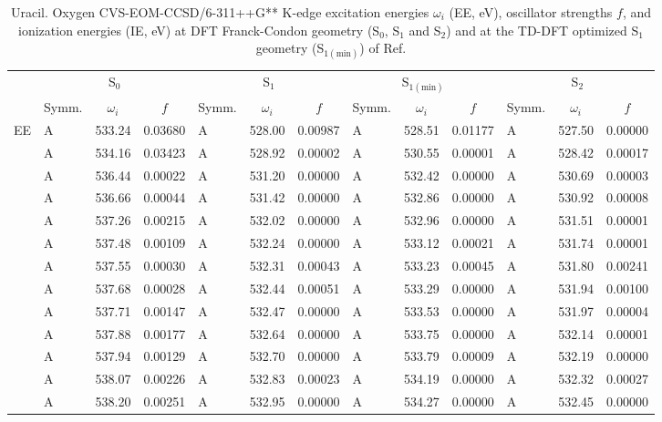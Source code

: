 \documentclass[journal=jctcce,manuscript=article]{achemso}
\begin{document}
\begin{table}
\caption{Uracil.  Oxygen CVS-EOM-CCSD/6-311++G** K-edge excitation energies $\omega_i$ (EE, eV), oscillator strengths $f$, and ionization energies (IE, eV) at DFT Franck-Condon geometry (S$_0$, S$_1$ and S$_2$) and at the TD-DFT optimized S$_1$ geometry (S$_{1(\text{min})}$) of Ref. 
\label{Tab:Uracil_DFT:Oxygen}}
\scriptsize
\begin{tabular}{l|lcc|lcc|lcc|lcc}
\cline{2-13}
& \multicolumn{3}{c|}{S$_0$}
& \multicolumn{3}{c|}{S$_1$}  
& \multicolumn{3}{c|}{S$_{1(\text{min})}$}
& \multicolumn{3}{c}{S$_2$}
\\
\cline{2-13}
& Symm. & $\omega_i$ & $f$ 
& Symm. & $\omega_i$ & $f$ 
& Symm. & $\omega_i$ & $f$ 
& Symm. & $\omega_i$ & $f$\\
\hline
  EE 
& A & 533.24 & 0.03680 & A & 528.00 & 0.00987 & A & 528.51 & 0.01177 & A & 527.50 & 0.00000 \\
& A & 534.16 & 0.03423 & A & 528.92 & 0.00002 & A & 530.55 & 0.00001 & A & 528.42 & 0.00017 \\
& A & 536.44 & 0.00022 & A & 531.20 & 0.00000 & A & 532.42 & 0.00000 & A & 530.69 & 0.00003 \\
& A & 536.66 & 0.00044 & A & 531.42 & 0.00000 & A & 532.86 & 0.00000 & A & 530.92 & 0.00008 \\
& A & 537.26 & 0.00215 & A & 532.02 & 0.00000 & A & 532.96 & 0.00000 & A & 531.51 & 0.00001 \\
& A & 537.48 & 0.00109 & A & 532.24 & 0.00000 & A & 533.12 & 0.00021 & A & 531.74 & 0.00001 \\
& A & 537.55 & 0.00030 & A & 532.31 & 0.00043 & A & 533.23 & 0.00045 & A & 531.80 & 0.00241 \\
& A & 537.68 & 0.00028 & A & 532.44 & 0.00051 & A & 533.29 & 0.00000 & A & 531.94 & 0.00100 \\
& A & 537.71 & 0.00147 & A & 532.47 & 0.00000 & A & 533.53 & 0.00000 & A & 531.97 & 0.00004 \\
& A & 537.88 & 0.00177 & A & 532.64 & 0.00000 & A & 533.75 & 0.00000 & A & 532.14 & 0.00001 \\
& A & 537.94 & 0.00129 & A & 532.70 & 0.00000 & A & 533.79 & 0.00009 & A & 532.19 & 0.00000 \\
& A & 538.07 & 0.00226 & A & 532.83 & 0.00023 & A & 534.19 & 0.00000 & A & 532.32 & 0.00027 \\
& A & 538.20 & 0.00251 & A & 532.95 & 0.00000 & A & 534.27 & 0.00000 & A & 532.45 & 0.00000 \\

\end{tabular}
\end{table}
\end{document}
